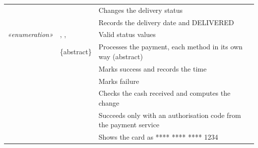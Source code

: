 \begin{longtable}{@{}P{2.6cm}P{7.0cm}P{5.4cm}@{}}
\footnotesize {} & \footnotesize {} & \footnotesize Changes the delivery status\\
\footnotesize {} & \footnotesize {} & \footnotesize Records the delivery date and DELIVERED\\
\footnotesize {}\newline\emph{«enumeration»} & \footnotesize {}, ,  & \footnotesize Valid status values\\
\footnotesize {} & \footnotesize {} \{abstract\} & \footnotesize Processes the payment, each method in its own way (abstract)\\
\footnotesize {} & \footnotesize {} & \footnotesize Marks success and records the time\\
\footnotesize {} & \footnotesize {} & \footnotesize Marks failure\\
\footnotesize {} & \footnotesize {} & \footnotesize Checks the cash received and computes the change\\
\footnotesize {} & \footnotesize {} & \footnotesize Succeeds only with an authorisation code from the payment service\\
\footnotesize {} & \footnotesize {} & \footnotesize Shows the card as **** **** **** 1234\\
\end{longtable}
